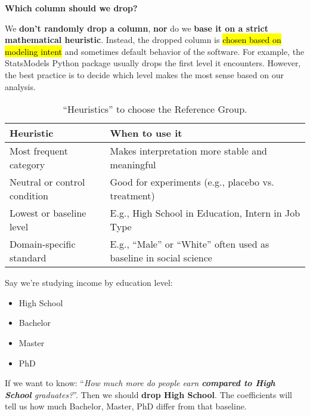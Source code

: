 \highspace
\begin{flushleft}
    \textcolor{Green3}{ \textbf{Which column should we drop?}}
\end{flushleft}
We \textbf{don't randomly drop a column}, \textbf{nor} do we \textbf{base it on a strict mathematical heuristic}. Instead, the dropped column is \hl{chosen based on modeling intent} and sometimes default behavior of the software. For example, the StatsModels Python package usually drops the first level it encounters. However, the best practice is to decide which level makes the most sense based on our analysis.

\newpage

\begin{table}[!htp]
    \centering
    \begin{adjustbox}{width={\textwidth},totalheight={\textheight},keepaspectratio}
        \begin{tabular}{@{} l p{22em} @{}}
            \toprule
            \textbf{Heuristic} & \textbf{When to use it} \\
            \midrule
            Most frequent category & Makes interpretation more stable and meaningful \\ [.5em]
            Neutral or control condition & Good for experiments (e.g., placebo vs. treatment) \\ [.5em]
            Lowest or baseline level & E.g., High School in Education, Intern in Job Type \\ [.5em]
            Domain-specific standard & E.g., ``Male'' or ``White'' often used as baseline in social science \\
            \bottomrule
        \end{tabular}
    \end{adjustbox}
    \caption{``Heuristics'' to choose the Reference Group.}
\end{table}

\begin{examplebox}
    Say we're studying income by education level:
    \begin{itemize}
        \item High School
        \item Bachelor
        \item Master
        \item PhD
    \end{itemize}
    If we want to know: ``\emph{How much more do people earn \textbf{compared to High School} graduates?}''. Then we should \textbf{drop High School}. The coefficients will tell us how much Bachelor, Master, PhD differ from that baseline.
\end{examplebox}


